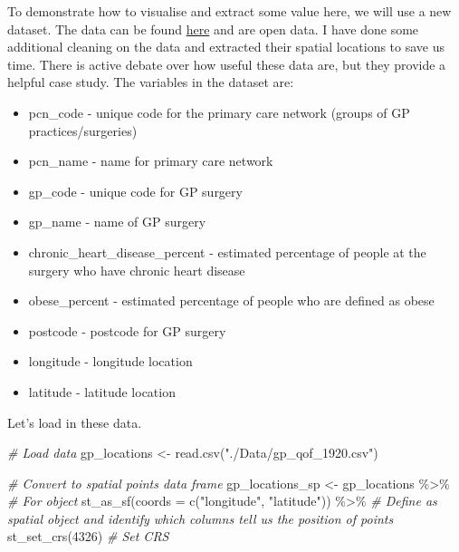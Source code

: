 \documentclass[
]{book}
\newenvironment{Shaded}{\begin{snugshade}}{\end{snugshade}}
\newcommand{\AttributeTok}[1]{\textcolor[rgb]{0.77,0.63,0.00}{#1}}
\newcommand{\CommentTok}[1]{\textcolor[rgb]{0.56,0.35,0.01}{\textit{#1}}}
\newcommand{\DecValTok}[1]{\textcolor[rgb]{0.00,0.00,0.81}{#1}}
\newcommand{\FunctionTok}[1]{\textcolor[rgb]{0.00,0.00,0.00}{#1}}
\newcommand{\NormalTok}[1]{#1}
\newcommand{\OtherTok}[1]{\textcolor[rgb]{0.56,0.35,0.01}{#1}}
\newcommand{\SpecialCharTok}[1]{\textcolor[rgb]{0.00,0.00,0.00}{#1}}
\newcommand{\StringTok}[1]{\textcolor[rgb]{0.31,0.60,0.02}{#1}}
\providecommand{\tightlist}{%
  \setlength{\itemsep}{0pt}\setlength{\parskip}{0pt}}
\begin{document}
To demonstrate how to visualise and extract some value here, we will use a new dataset. The data can be found \href{https://qof.digital.nhs.uk/}{here} and are open data. I have done some additional cleaning on the data and extracted their spatial locations to save us time. There is active debate over how useful these data are, but they provide a helpful case study. The variables in the dataset are:

\begin{itemize}
\tightlist
\item
  pcn\_code - unique code for the primary care network (groups of GP practices/surgeries)
\item
  pcn\_name - name for primary care network
\item
  gp\_code - unique code for GP surgery
\item
  gp\_name - name of GP surgery
\item
  chronic\_heart\_disease\_percent - estimated percentage of people at the surgery who have chronic heart disease
\item
  obese\_percent - estimated percentage of people who are defined as obese
\item
  postcode - postcode for GP surgery
\item
  longitude - longitude location
\item
  latitude - latitude location
\end{itemize}

Let's load in these data.

\begin{Shaded}
\begin{Highlighting}[]
\CommentTok{\# Load data}
\NormalTok{gp\_locations }\OtherTok{\textless{}{-}} \FunctionTok{read.csv}\NormalTok{(}\StringTok{"./Data/gp\_qof\_1920.csv"}\NormalTok{)}

\CommentTok{\# Convert to spatial points data frame}
\NormalTok{gp\_locations\_sp }\OtherTok{\textless{}{-}}\NormalTok{ gp\_locations }\SpecialCharTok{\%\textgreater{}\%} \CommentTok{\# For object}
  \FunctionTok{st\_as\_sf}\NormalTok{(}\AttributeTok{coords =} \FunctionTok{c}\NormalTok{(}\StringTok{"longitude"}\NormalTok{, }\StringTok{"latitude"}\NormalTok{)) }\SpecialCharTok{\%\textgreater{}\%} \CommentTok{\# Define as spatial object and identify which columns tell us the position of points}
  \FunctionTok{st\_set\_crs}\NormalTok{(}\DecValTok{4326}\NormalTok{) }\CommentTok{\# Set CRS}
\end{Highlighting}
\end{Shaded}
\end{document}
